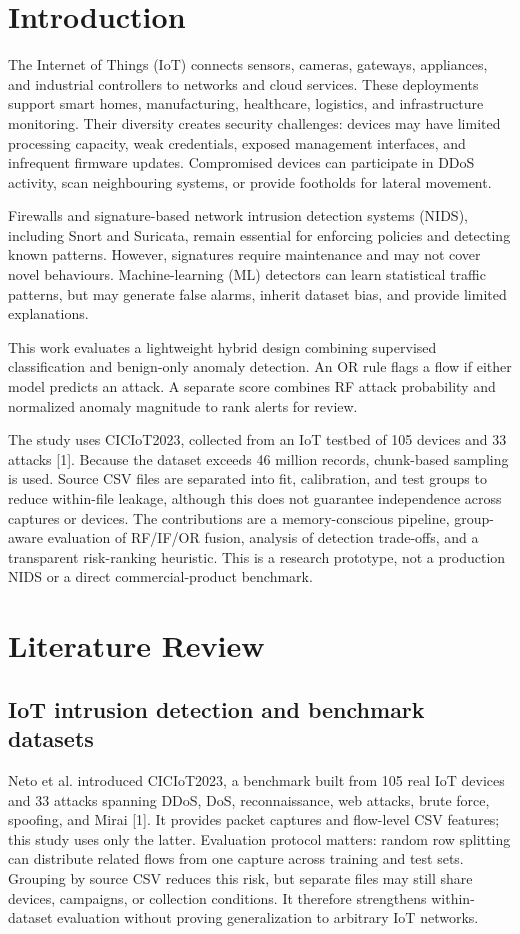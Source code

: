 \documentclass[runningheads]{llncs}
\begin{document}
\section{Introduction}
The Internet of Things (IoT) connects sensors, cameras, gateways, appliances, and industrial controllers to networks and cloud services. These deployments support smart homes, manufacturing, healthcare, logistics, and infrastructure monitoring. Their diversity creates security challenges: devices may have limited processing capacity, weak credentials, exposed management interfaces, and infrequent firmware updates. Compromised devices can participate in DDoS activity, scan neighbouring systems, or provide footholds for lateral movement.

Firewalls and signature-based network intrusion detection systems (NIDS), including Snort and Suricata, remain essential for enforcing policies and detecting known patterns. However, signatures require maintenance and may not cover novel behaviours. Machine-learning (ML) detectors can learn statistical traffic patterns, but may generate false alarms, inherit dataset bias, and provide limited explanations.

This work evaluates a lightweight hybrid design combining supervised classification and benign-only anomaly detection. An OR rule flags a flow if either model predicts an attack. A separate score combines RF attack probability and normalized anomaly magnitude to rank alerts for review.

The study uses CICIoT2023, collected from an IoT testbed of 105 devices and 33 attacks [1]. Because the dataset exceeds 46 million records, chunk-based sampling is used. Source CSV files are separated into fit, calibration, and test groups to reduce within-file leakage, although this does not guarantee independence across captures or devices. The contributions are a memory-conscious pipeline, group-aware evaluation of RF/IF/OR fusion, analysis of detection trade-offs, and a transparent risk-ranking heuristic. This is a research prototype, not a production NIDS or a direct commercial-product benchmark.

\section{Literature Review}
\subsection{IoT intrusion detection and benchmark datasets}
Neto et al. introduced CICIoT2023, a benchmark built from 105 real IoT devices and 33 attacks spanning DDoS, DoS, reconnaissance, web attacks, brute force, spoofing, and Mirai [1]. It provides packet captures and flow-level CSV features; this study uses only the latter. Evaluation protocol matters: random row splitting can distribute related flows from one capture across training and test sets. Grouping by source CSV reduces this risk, but separate files may still share devices, campaigns, or collection conditions. It therefore strengthens within-dataset evaluation without proving generalization to arbitrary IoT networks.
\end{document}
